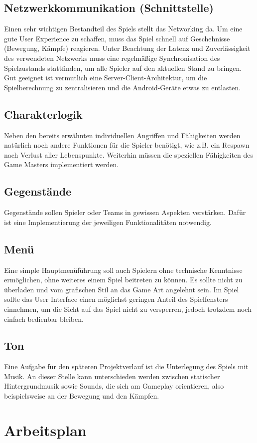 \documentclass[10pt,a4paper,notitlepage]{report}
\begin{document}
\begin{flushleft}
\subsection{Netzwerkkommunikation (Schnittstelle)}
Einen sehr wichtigen Bestandteil des Spiels stellt das Networking da. Um eine gute User Experience zu schaffen, muss das Spiel schnell auf Geschehnisse (Bewegung, Kämpfe) reagieren. Unter Beachtung der Latenz und Zuverlässigkeit des verwendeten Netzwerks muss eine regelmäßige Synchronisation des Spielzustands stattfinden, um alle Spieler auf den aktuellen Stand zu bringen. Gut geeignet ist vermutlich eine Server-Client-Architektur, um die Spielberechnung zu zentralisieren und die Android-Geräte etwas zu entlasten. 

\subsection{Charakterlogik} 
Neben den bereits erwähnten individuellen Angriffen und Fähigkeiten werden natürlich noch andere Funktionen für die Spieler benötigt, wie z.B. ein Respawn nach Verlust aller Lebenspunkte. Weiterhin müssen die speziellen Fähigkeiten des Game Masters implementiert werden.

\subsection{Gegenstände}
Gegenstände sollen Spieler oder Teams in gewissen Aspekten verstärken. Dafür ist eine Implementierung der jeweiligen Funktionalitäten notwendig.

\subsection{Menü}
Eine simple Hauptmenüführung soll auch Spielern ohne technische Kenntnisse ermöglichen, ohne weiteres einem Spiel beitreten zu können. Es sollte nicht zu überladen und vom grafischen Stil an das Game Art angelehnt sein. Im Spiel sollte das User Interface einen möglichst geringen Anteil des Spielfensters einnehmen, um die Sicht auf das Spiel nicht zu versperren, jedoch trotzdem noch einfach bedienbar bleiben. 

\subsection{Ton} 
Eine Aufgabe für den späteren Projektverlauf ist die Unterlegung des Spiels mit Musik. An dieser Stelle kann unterschieden werden zwischen statischer Hintergrundmusik sowie Sounds, die sich am Gameplay orientieren, also beispielsweise an der Bewegung und den Kämpfen.
\section{Arbeitsplan}


\end{flushleft}
\end{document}
